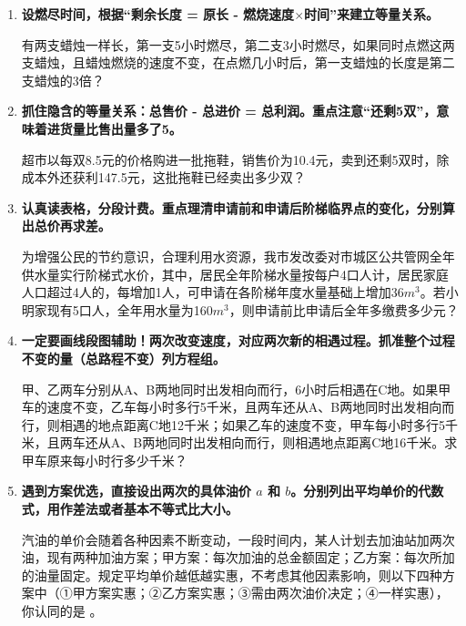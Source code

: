 \documentclass{ctexart}
\begin{document}
\begin{enumerate}
    \item \textbf{设燃尽时间，根据“剩余长度 = 原长 - 燃烧速度$\times$时间”来建立等量关系。}
    
    有两支蜡烛一样长，第一支5小时燃尽，第二支3小时燃尽，如果同时点燃这两支蜡烛，且蜡烛燃烧的速度不变，在点燃几小时后，第一支蜡烛的长度是第二支蜡烛的3倍？
    \vspace{2cm}

    \item \textbf{抓住隐含的等量关系：总售价 - 总进价 = 总利润。重点注意“还剩5双”，意味着进货量比售出量多了5。}
    
    超市以每双8.5元的价格购进一批拖鞋，销售价为10.4元，卖到还剩5双时，除成本外还获利147.5元，这批拖鞋已经卖出多少双？
    \vspace{2cm}

    \item \textbf{认真读表格，分段计费。重点理清申请前和申请后阶梯临界点的变化，分别算出总价再求差。}
    
    为增强公民的节约意识，合理利用水资源，我市发改委对市城区公共管网全年供水量实行阶梯式水价，其中，居民全年阶梯水量按每户4口人计，居民家庭人口超过4人的，每增加1人，可申请在各阶梯年度水量基础上增加36$m^3$。若小明家现有5口人，全年用水量为160$m^3$，则申请前比申请后全年多缴费多少元？
    \vspace{2cm}

    \item \textbf{一定要画线段图辅助！两次改变速度，对应两次新的相遇过程。抓准整个过程不变的量（总路程不变）列方程组。}
    
    甲、乙两车分别从A、B两地同时出发相向而行，6小时后相遇在C地。如果甲车的速度不变，乙车每小时多行5千米，且两车还从A、B两地同时出发相向而行，则相遇的地点距离C地12千米；如果乙车的速度不变，甲车每小时多行5千米，且两车还从A、B两地同时出发相向而行，则相遇地点距离C地16千米。求甲车原来每小时行多少千米？
    \vspace{2cm}

    \item \textbf{遇到方案优选，直接设出两次的具体油价 $a$ 和 $b$。分别列出平均单价的代数式，用作差法或者基本不等式比大小。}
    
    汽油的单价会随着各种因素不断变动，一段时间内，某人计划去加油站加两次油，现有两种加油方案；甲方案：每次加油的总金额固定；乙方案：每次所加的油量固定。规定平均单价越低越实惠，不考虑其他因素影响，则以下四种方案中（①甲方案实惠；②乙方案实惠；③需由两次油价决定；④一样实惠），你认同的是 \underline{\hspace{2cm}}。
    \vspace{2cm}


\end{enumerate}
\end{document}
